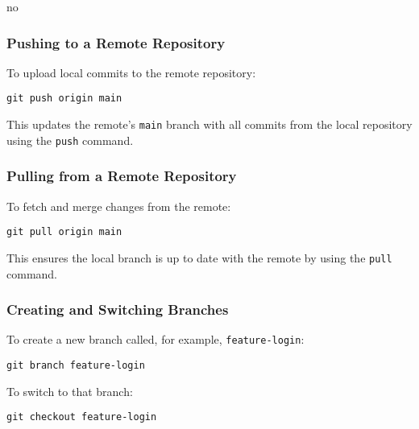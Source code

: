no\documentclass{article}
\newcommand{\codecmd}[1]{\textcolor[rgb]{0,0.5,0}{\texttt{#1}}}
\begin{document}
\subsubsection{Pushing to a Remote Repository}

To upload local commits to the remote repository:

\begin{tcolorbox}[colback=mintgreen, colframe=green!40!black, boxrule=0.5pt, sharp corners]
\begin{verbatim}
git push origin main
\end{verbatim}
\end{tcolorbox}

\noindent This updates the remote’s \codecmd{main} branch with all commits from the local repository using the \codecmd{push} command.

\subsubsection{Pulling from a Remote Repository}

To fetch and merge changes from the remote:

\begin{tcolorbox}[colback=mintgreen, colframe=green!40!black, boxrule=0.5pt, sharp corners]
\begin{verbatim}
git pull origin main
\end{verbatim}
\end{tcolorbox}

\noindent This ensures the local branch is up to date with the remote by using the \codecmd{pull} command.

\subsubsection{Creating and Switching Branches}

To create a new branch called, for example, \codecmd{feature-login}:

\begin{tcolorbox}[colback=mintgreen, colframe=green!40!black, boxrule=0.5pt, sharp corners]
\begin{verbatim}
git branch feature-login
\end{verbatim}
\end{tcolorbox}

\noindent To switch to that branch:

\begin{tcolorbox}[colback=mintgreen, colframe=green!40!black, boxrule=0.5pt, sharp corners]
\begin{verbatim}
git checkout feature-login
\end{verbatim}
\end{tcolorbox}
\end{document}
